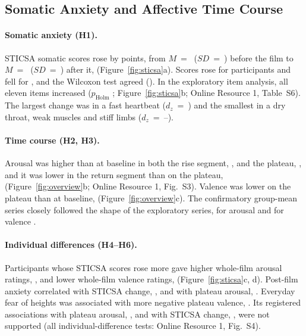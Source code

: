 \documentclass[man,12pt,british]{apa7}
\begin{document}
\subsection{Somatic Anxiety and Affective Time Course}

\paragraph{Somatic anxiety (H1).} STICSA somatic scores rose by  points, from $M$~=~
($SD$~=~) before the film to $M$~=~ ($SD$~=~) after it,
 (Figure~\ref{fig:sticsa}a). Scores rose for  participants and fell for
, and the Wilcoxon test agreed (). In the exploratory item analysis, all eleven
items increased ($p_\mathrm{Holm}$ ; Figure~\ref{fig:sticsa}b; Online Resource 1, Table~S6).
The largest change was in a fast heartbeat ($d_z$~=~) and the smallest in a dry throat, weak
muscles and stiff limbs ($d_z$~=~--).

\paragraph{Time course (H2, H3).} Arousal was higher than at baseline in both the rise segment, , and
the plateau, , and it was lower in the return segment than on the plateau, 
(Figure~\ref{fig:overview}b; Online Resource 1, Fig.~S3). Valence was lower on the plateau than at baseline,
 (Figure~\ref{fig:overview}c). The confirmatory group-mean series closely followed the shape of the
exploratory series, for arousal  and for valence .

\paragraph{Individual differences (H4--H6).} Participants whose STICSA scores rose more gave higher whole-film arousal
ratings, , and lower whole-film valence ratings,  (Figure~\ref{fig:sticsa}c, d).
Post-film anxiety correlated with STICSA change, , and with plateau arousal, .
Everyday fear of heights was associated with more negative plateau valence, . Its registered
associations with plateau arousal, , and with STICSA change, , were not supported
(all individual-difference tests: Online Resource 1, Fig.~S4).
\end{document}
